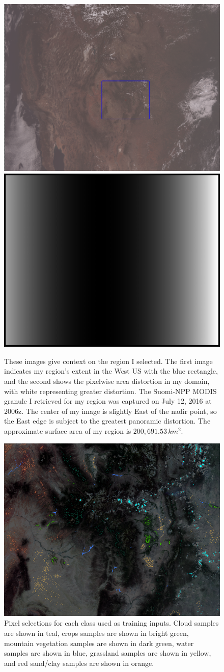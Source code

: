 \documentclass[12pt]{article}
\begin{document}
\begin{figure}[h!]
    \centering
    \includegraphics[width=.50\linewidth]{figures/p4/region_indicator.png}
    \includegraphics[width=.48\linewidth]{figures/p4/pixel_area_ratio_bordered.png}
    \caption{These images give context on the region I selected. The first image indicates my region's extent in the West US with the blue rectangle, and the second shows the pixelwise area distortion in my domain, with white representing greater distortion. The Suomi-NPP MODIS granule I retrieved for my region was captured on July 12, 2016 at 2006z. The center of my image is slightly East of the nadir point, so the East edge is subject to the greatest panoramic distortion. The approximate surface area of my region is $200,691.53\,km^2$.}
    \label{p3_region}
\end{figure}

\begin{figure}[h!]
    \centering
    \includegraphics[width=.7\linewidth]{figures/p3/selections.png}
    \caption{Pixel selections for each class used as training inputs. Cloud samples are shown in teal, crops samples are shown in bright green, mountain vegetation samples are shown in dark green, water samples are shown in blue, grassland samples are shown in yellow, and red sand/clay samples are shown in orange.}
    \label{p3_pixels}
\end{figure}
\end{document}
